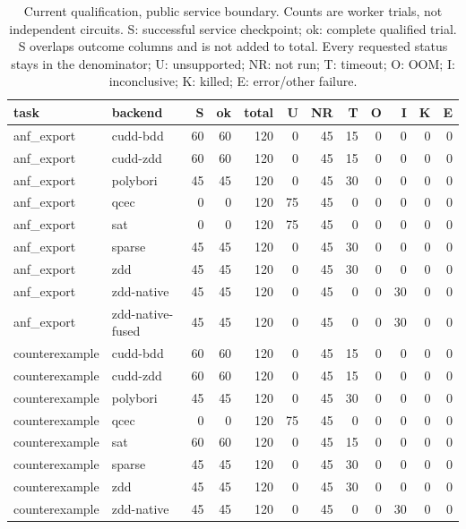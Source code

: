 \begin{table}[tbp]
\centering\scriptsize
\setlength{\tabcolsep}{3pt}
\caption{Current qualification, public service boundary. Counts are worker trials, not independent circuits. S: successful service checkpoint; ok: complete qualified trial. S overlaps outcome columns and is not added to total. Every requested status stays in the denominator; U: unsupported; NR: not run; T: timeout; O: OOM; I: inconclusive; K: killed; E: error/other failure.}
\label{tab:current-coverage}
\begin{tabular}{llrrrrrrrrrr}
\toprule
task & backend & S & ok & total & U & NR & T & O & I & K & E \\
\midrule
anf\_export & cudd-bdd & 60 & 60 & 120 & 0 & 45 & 15 & 0 & 0 & 0 & 0 \\
anf\_export & cudd-zdd & 60 & 60 & 120 & 0 & 45 & 15 & 0 & 0 & 0 & 0 \\
anf\_export & polybori & 45 & 45 & 120 & 0 & 45 & 30 & 0 & 0 & 0 & 0 \\
anf\_export & qcec & 0 & 0 & 120 & 75 & 45 & 0 & 0 & 0 & 0 & 0 \\
anf\_export & sat & 0 & 0 & 120 & 75 & 45 & 0 & 0 & 0 & 0 & 0 \\
anf\_export & sparse & 45 & 45 & 120 & 0 & 45 & 30 & 0 & 0 & 0 & 0 \\
anf\_export & zdd & 45 & 45 & 120 & 0 & 45 & 30 & 0 & 0 & 0 & 0 \\
anf\_export & zdd-native & 45 & 45 & 120 & 0 & 45 & 0 & 0 & 30 & 0 & 0 \\
anf\_export & zdd-native-fused & 45 & 45 & 120 & 0 & 45 & 0 & 0 & 30 & 0 & 0 \\
counterexample & cudd-bdd & 60 & 60 & 120 & 0 & 45 & 15 & 0 & 0 & 0 & 0 \\
counterexample & cudd-zdd & 60 & 60 & 120 & 0 & 45 & 15 & 0 & 0 & 0 & 0 \\
counterexample & polybori & 45 & 45 & 120 & 0 & 45 & 30 & 0 & 0 & 0 & 0 \\
counterexample & qcec & 0 & 0 & 120 & 75 & 45 & 0 & 0 & 0 & 0 & 0 \\
counterexample & sat & 60 & 60 & 120 & 0 & 45 & 15 & 0 & 0 & 0 & 0 \\
counterexample & sparse & 45 & 45 & 120 & 0 & 45 & 30 & 0 & 0 & 0 & 0 \\
counterexample & zdd & 45 & 45 & 120 & 0 & 45 & 30 & 0 & 0 & 0 & 0 \\
counterexample & zdd-native & 45 & 45 & 120 & 0 & 45 & 0 & 0 & 30 & 0 & 0 \\

\end{tabular}
\end{table}

